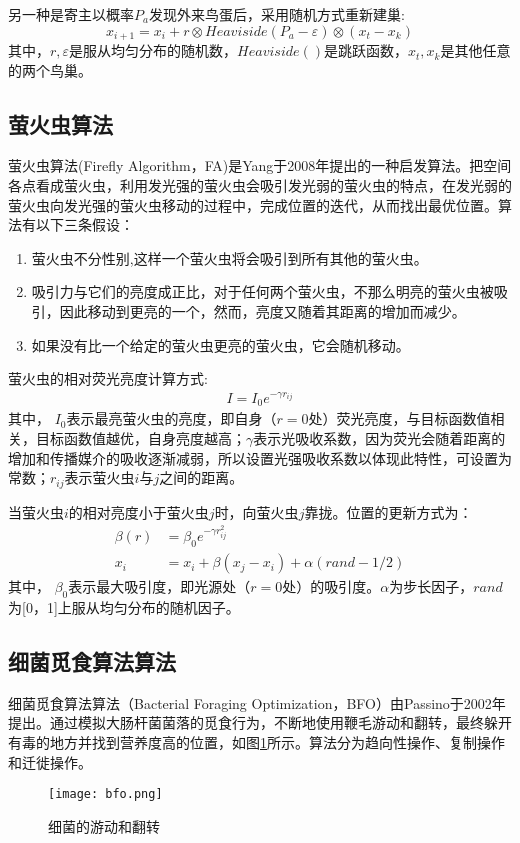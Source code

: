     另一种是寄主以概率$P_a$发现外来鸟蛋后，采用随机方式重新建巢:
    \begin{equation}
      x_{i+1}=x_i+r\otimes Heaviside(P_a-\varepsilon)\otimes(x_t-x_k)
    \end{equation}
    其中，$r,\varepsilon$是服从均匀分布的随机数，$Heaviside()$是跳跃函数，$x_t,x_k$是其他任意的两个鸟巢。

  \subsection{萤火虫算法}
    萤火虫算法(Firefly Algorithm，FA)是Yang于2008年提出的一种启发算法。把空间各点看成萤火虫，利用发光强的萤火虫会吸引发光弱的萤火虫的特点，在发光弱的萤火虫向发光强的萤火虫移动的过程中，完成位置的迭代，从而找出最优位置。算法有以下三条假设：
    \begin{enumerate}
      \item {萤火虫不分性别,这样一个萤火虫将会吸引到所有其他的萤火虫。}
      \item {吸引力与它们的亮度成正比，对于任何两个萤火虫，不那么明亮的萤火虫被吸引，因此移动到更亮的一个，然而，亮度又随着其距离的增加而减少。}
      \item {如果没有比一个给定的萤火虫更亮的萤火虫，它会随机移动。}
    \end{enumerate}
    萤火虫的相对荧光亮度计算方式:
    \begin{align}
      I=I_0e^{-\gamma r_{ij}}
    \end{align}
    其中， $I_0$表示最亮萤火虫的亮度，即自身（$r=0$处）荧光亮度，与目标函数值相关，目标函数值越优，自身亮度越高；$\gamma$表示光吸收系数，因为荧光会随着距离的增加和传播媒介的吸收逐渐减弱，所以设置光强吸收系数以体现此特性，可设置为常数；$r_{ij}$表示萤火虫$i$与$j$之间的距离。 

    当萤火虫$i$的相对亮度小于萤火虫$j$时，向萤火虫$j$靠拢。位置的更新方式为：
    \begin{align}
      \beta(r)&=\beta_0e^{-\gamma r_{ij}^2} \\
      x_i&=x_i+\beta(x_j-x_i)+\alpha(rand-1/2)
    \end{align}
    其中， $\beta_0$表示最大吸引度，即光源处（$r=0$处）的吸引度。$\alpha$为步长因子，$rand$为[0，1]上服从均匀分布的随机因子。

  \subsection{细菌觅食算法算法}
  细菌觅食算法算法（Bacterial Foraging Optimization，BFO）由Passino于2002年提出。通过模拟大肠杆菌菌落的觅食行为，不断地使用鞭毛游动和翻转，最终躲开有毒的地方并找到营养度高的位置，如图\ref{fig:bfo}所示。算法分为趋向性操作、复制操作和迁徙操作。
  \begin{figure}[htbp]
    \centering
    \texttt{[image: bfo.png]}
    \caption{细菌的游动和翻转}
    \label{fig:bfo}
  \end{figure}

